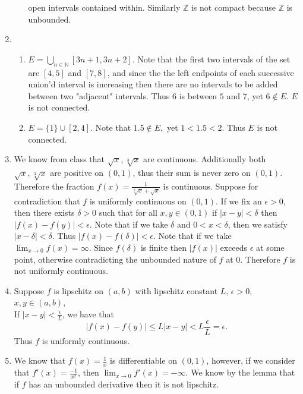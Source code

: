 \documentclass[12pt, letterpaper]{article}
\newcommand{\Z}{\mathbb{Z}}
\newcommand{\N}{\mathbb{N}}
\begin{document}
\begin{enumerate}
\begin{enumerate}
		open intervals contained within.  Similarly $\Z$ is not compact because
		$\Z$ is unbounded.  
	\end{enumerate}	  
	\item 
	\begin{enumerate}
		\item $E = \bigcup_{n \in \N} [3n+1,3n+2]$.  Note that the first two 
		intervals of the set are $[4,5]$ and $[7,8]$, and since the the left 
		endpoints of each successive union'd interval is increasing then there are 
		no intervals to be added between two "adjacent" intervals.  Thus 6 is 
		between $5$ and $7$, yet $6 \not \in E$.  $E$ is not connected.  
		\item $E = \{1\} \cup [2,4]$.  Note that $1.5 \not \in E,$ yet $1 < 1.5 < 2$.  Thus $E$ is not connected.
	\end{enumerate}
	\item We know from class that $\sqrt{x},\sqrt[3]{x}$ are continuous. 
	Additionally both $\sqrt{x},\sqrt[3]{x}$ are positive on $(0,1)$, thus 
	their sum is never zero on $(0,1)$.  Therefore the fraction $f(x)  =\frac{1}{\sqrt[3]{x} + \sqrt{x}}$ is continuous.  Suppose for contradiction that $f$ is 
	uniformly continuous on $(0,1)$.  If we fix an $\epsilon > 0$, then there 
	exists $\delta > 0$ such that for all $x,y \in (0,1)$ if $|x-y| < \delta$
	then $|f(x) - f(y)| < \epsilon$.  Note that if we take $\delta$ and $0<x < \delta$, then we satisfy $|x-\delta| < \delta$.  Thus $|f(x) - f(\delta)|<\epsilon$.  Note that if we take $\lim_{x \to 0} f(x) = \infty$.  Since 
	$f(\delta)$ is finite then $|f(x)|$ exceeds $\epsilon$ at some point, otherwise
	contradicting the unbounded nature of $f$ at 0.  Therefore $f$ is not 
	uniformly continuous.  
	\item Suppose $f$ is lipschitz on $(a,b)$ with lipschitz constant $L$,
	$\epsilon > 0$, $x,y \in (a,b)$,\\ If $|x-y| < \frac{\epsilon}{L}$, we have
	that 
	$$
	|f(x) - f(y)| \leq L|x-y| < L \frac{\epsilon}{L} = \epsilon.
	$$
	Thus $f$ is uniformly continuous.  
	\item We know that $f(x) = \frac{1}{x}$ is differentiable on $(0,1)$, however, 
	if we consider that $f'(x) = \frac{-1}{x^2}$, then $\lim_{x\to 0} f'(x) = - \infty$.  We know by the lemma that if $f$ has an unbounded derivative then it is 
	not lipschitz.  
\end{enumerate}
\end{document}

